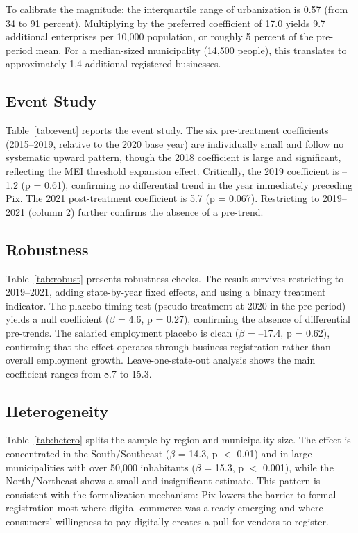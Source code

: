 \documentclass[12pt]{article}
\begin{document}
To calibrate the magnitude: the interquartile range of urbanization is 0.57 (from 34 to 91 percent). Multiplying by the preferred coefficient of 17.0 yields 9.7 additional enterprises per 10,000 population, or roughly 5 percent of the pre-period mean. For a median-sized municipality (14,500 people), this translates to approximately 1.4 additional registered businesses.

\subsection{Event Study}



Table~\ref{tab:event} reports the event study. The six pre-treatment coefficients (2015--2019, relative to the 2020 base year) are individually small and follow no systematic upward pattern, though the 2018 coefficient is large and significant, reflecting the MEI threshold expansion effect. Critically, the 2019 coefficient is --1.2 (p = 0.61), confirming no differential trend in the year immediately preceding Pix. The 2021 post-treatment coefficient is 5.7 (p = 0.067). Restricting to 2019--2021 (column 2) further confirms the absence of a pre-trend.

\subsection{Robustness}



Table~\ref{tab:robust} presents robustness checks. The result survives restricting to 2019--2021, adding state-by-year fixed effects, and using a binary treatment indicator. The placebo timing test (pseudo-treatment at 2020 in the pre-period) yields a null coefficient ($\beta$ = 4.6, p = 0.27), confirming the absence of differential pre-trends. The salaried employment placebo is clean ($\beta$ = --17.4, p = 0.62), confirming that the effect operates through business registration rather than overall employment growth. Leave-one-state-out analysis shows the main coefficient ranges from 8.7 to 15.3.

\subsection{Heterogeneity}



Table~\ref{tab:hetero} splits the sample by region and municipality size. The effect is concentrated in the South/Southeast ($\beta$ = 14.3, p $<$ 0.01) and in large municipalities with over 50,000 inhabitants ($\beta$ = 15.3, p $<$ 0.001), while the North/Northeast shows a small and insignificant estimate. This pattern is consistent with the formalization mechanism: Pix lowers the barrier to formal registration most where digital commerce was already emerging and where consumers' willingness to pay digitally creates a pull for vendors to register.
\end{document}

